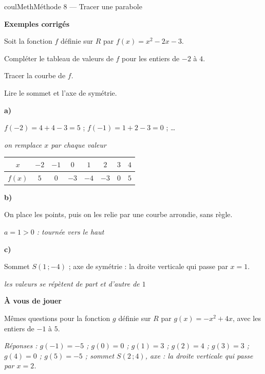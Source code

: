 \documentclass[11pt,a4paper]{article}
\makeatletter
\newcommand{\R}{\mathbb{R}}
\newcommand{\N}{\mathbb{N}}
\newcommand{\Z}{\mathbb{Z}}
\newcommand{\Q}{\mathbb{Q}}
\newcommand{\vect}[1]{\overrightarrow{#1}}
\newcommand{\fois}[1]{\times{\color{coulExo}#1}}
\newcommand{\lycee@repere}[4]{%
  \draw[grille,step=1] (#1,#2) grid (#3,#4);
  \draw[-{Stealth[length=2mm]},thick] (#1,0)--({#3+0.4},0) node[below left=-1pt]{$x$};
  \draw[-{Stealth[length=2mm]},thick] (0,#2)--(0,{#4+0.4}) node[below left=-1pt]{$y$};
  \node[below left,font=\scriptsize,inner sep=1.5pt] at (0,0) {$0$};}
\newcommand{\lycee@gradx}[1]{\foreach \k/\l in {#1}{%
  \draw (\k,0.07)--(\k,-0.07) node[below,font=\scriptsize,inner sep=1.5pt]{$\l$};}}
\newcommand{\lycee@grady}[1]{\foreach \k/\l in {#1}{%
  \draw (0.07,\k)--(-0.07,\k) node[left,font=\scriptsize,inner sep=1.5pt]{$\l$};}}
\providecommand{\repere}{\lycee@repere}%
\providecommand{\gradx}{\lycee@gradx}%
\providecommand{\grady}{\lycee@grady}%
\providecommand{\Cf}{\mathcal{C}\sb{f}}%
\providecommand{\Cg}{\mathcal{C}\sb{g}}%
\newcounter{lycee@signet}
\newcommand{\signet}[3][]{\stepcounter{lycee@signet}%
  \edef\lycee@dest{\if\relax\detokenize{#1}\relax
    signet.\arabic{lycee@signet}\else#1\fi}%
  \hypertarget{\lycee@dest}{}\bookmark[level=#2,dest=\lycee@dest]{#3}}
\def\R{R}\def\N{N}\def\Z{Z}\def\Q{Q}\def\vect#1{#1}\def\Cf{Cf}\def\Cg{Cg}\def\fois#1{×#1}%
\newcommand{\res}[1]{#1}
\newcounter{methode}
\newenvironment{methodebox}[1][Méthode]{\stepcounter{methode}%
  \begin{boitecours}[phantom={\signet[methode-\arabic{methode}]{2}{#1}}]{coulMeth}{#1}}%
  {\end{boitecours}}
\newcommand{\etape}[1]{\par\smallskip\textbf{\color{coulMeth}#1}\par\nobreak\smallskip}
\newcommand{\reponse}[1]{\par\smallskip
  {\footnotesize\itshape\color{black!55}Réponses : #1}}
\newcommand{\explique}[2]{\par\smallskip\noindent
  \begin{minipage}[t]{0.57\linewidth}\raggedright #1\end{minipage}\hfill
  \begin{minipage}[t]{0.40\linewidth}\raggedright\leavevmode
    {\small\itshape\color{black!60}#2}\end{minipage}\par}
\newcommand{\cas}[1]{\par\smallskip\noindent\textbf{\color{coulExo}#1}\vadjust{\nobreak}}
\newenvironment{correction}{\par}{\par}
\newcommand{\etapeexemples}{\etape{Exemples corrigés}}
\makeatother
\begin{document}
\begin{methodebox}[Méthode 8 --- Tracer une parabole]
\etapeexemples
Soit la fonction $f$ définie sur $\R$ par $f(x)=x^{2}-2x-3$.
\begin{questions}[label=\alph*)]
  \item Compléter le tableau de valeurs de $f$ pour les entiers de $-2$ à $4$.
  \item Tracer la courbe de $f$.
  \item Lire le sommet et l'axe de symétrie.
\end{questions}
\begin{correction}
\cas{a)}\par\nopagebreak
\begin{minipage}[c]{0.58\linewidth}\raggedright
\explique{$f(-2)=4+4-3=5$ ; $f(-1)=1+2-3=0$ ; …}{on remplace $x$ par chaque valeur}
\begin{center}\small
\renewcommand{\arraystretch}{1.3}
\begin{tabular}{|c|c|c|c|c|c|c|c|}
\hline
$x$ & $-2$ & $-1$ & $0$ & $1$ & $2$ & $3$ & $4$\\
\hline
$f(x)$ & $5$ & $0$ & $-3$ & $-4$ & $-3$ & $0$ & $5$\\
\hline
\end{tabular}
\end{center}
\cas{b)}
\explique{On place les points, puis on les relie par une courbe arrondie, sans
règle.}{$a=1>0$ : tournée vers le haut}
\cas{c)}
\explique{Sommet \res{$S(1\,;-4)$} ; axe de symétrie : \res{la droite verticale qui passe par
$x=1$}.}{les valeurs se répètent de part et d'autre de $1$}
\end{minipage}\hfill
\begin{minipage}[c]{0.38\linewidth}\centering
{}
\end{minipage}
\end{correction}

\etape{À vous de jouer}
Mêmes questions pour la fonction $g$ définie sur $\R$ par $g(x)=-x^{2}+4x$, avec les entiers de $-1$ à $5$.
\reponse{$g(-1)=-5$ ; $g(0)=0$ ; $g(1)=3$ ; $g(2)=4$ ; $g(3)=3$ ; $g(4)=0$ ; $g(5)=-5$ ;\;
sommet $S(2\,;4)$, axe : la droite verticale qui passe par $x=2$.}
\end{methodebox}
\end{document}
